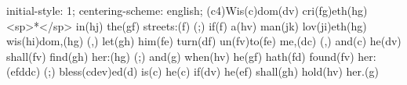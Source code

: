initial-style: 1;
centering-scheme: english;
(c4)Wis(c)dom(dv) cri(fg)eth(hg) <sp>*</sp> in(hj) the(gf) streets:(f) (;) if(f) a(hv) man(jk) lov(ji)eth(hg) wis(hi)dom,(hg) (,) let(gh) him(fe) turn(df) un(fv)to(fe) me,(dc) (,) and(c) he(dv) shall(fv) find(gh) her:(hg) (;) and(g) when(hv) he(gf) hath(fd) found(fv) her:(efddc) (;) bless(cdev)ed(d) is(c) he(c) if(dv) he(ef) shall(gh) hold(hv) her.(g)
